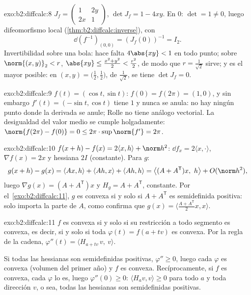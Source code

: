 \begin{solution}{exo:b2:diffcalc:8}
$J_f = \begin{pmatrix} 1 & 2y\\ 2x & 1\end{pmatrix}$, $\det J_f = 1 -
4xy$. En $0$: $\det = 1 \neq 0$, luego difeomorfismo local
(\cref{thm:b2:diffcalc:inverse}), con
\[
\dd(f^{-1})_{(0,0)} = (J_f(0))^{-1} = I_2 .
\]
Invertibilidad sobre una bola: hace falta $4\abs{xy} < 1$ en todo
punto; sobre $\norm{(x,y)}_2 < r$, $\abs{xy} \leq \frac{x^2 +
y^2}{2} < \frac{r^2}{2}$, de modo que $r = \frac{1}{\sqrt2}$ sirve; y
es el mayor posible: en $(x, y) = \bigl(\tfrac12, \tfrac12\bigr)$,
de  $\frac{1}{\sqrt2}$, se tiene $\det J_f = 0$.
\end{solution}

\begin{solution}{exo:b2:diffcalc:9}
$f(t) = (\cos t, \sin t)$: $f(0) = f(2\pi) = (1, 0)$, y sin embargo
$f'(t) = (-\sin t, \cos t)$ tiene  $1$ y nunca se anula: no hay
ningún punto donde la derivada se anule; Rolle no tiene análogo
vectorial. La desigualdad del valor medio se cumple holgadamente:
$\norm{f(2\pi) - f(0)} = 0 \leq 2\pi \cdot \sup\norm{f'} = 2\pi$.
\end{solution}

\begin{solution}{exo:b2:diffcalc:10}
$f(x+h) - f(x) = 2\langle x, h\rangle + \norm h^2$: $\dd f_x =
2\langle x, \cdot\rangle$, $\nabla f(x) = 2x$ y hessiana $2I$
(constante). Para $g$:
\[
g(x + h) - g(x) = \langle Ax, h\rangle + \langle Ah, x\rangle
+ \langle Ah, h\rangle
= \bigl\langle (A + A^{\mathsf T})x,\ h\bigr\rangle +
O(\norm h^2),
\]
luego $\nabla g(x) = (A + A^{\mathsf T})x$ y $H_g = A + A^{\mathsf
T}$, constante. Por el~\cref{exo:b2:diffcalc:11}, $g$ es convexa si y
solo si $A + A^{\mathsf T}$ es semidefinida positiva: solo importa la
parte  de $A$, como confirma que $g(x) = \langle \frac{A +
A^{\mathsf T}}2 x, x\rangle$.
\end{solution}

\begin{solution}{exo:b2:diffcalc:11}
$f$ es convexa si y solo si su restricción a todo segmento es
convexa, es decir, si y solo si toda $\varphi(t) = f(a + tv)$ es
convexa. Por la regla de la cadena, $\varphi''(t) = \langle
H_{a+tv}\,v,\ v\rangle$.

Si todas las hessianas son semidefinidas positivas, $\varphi'' \geq
0$, luego cada $\varphi$ es convexa (volumen del primer año) y $f$ es
convexa. Recíprocamente, si $f$ es convexa, cada $\varphi$ lo es,
luego $\varphi''(0) \geq 0$: $\langle H_a v, v\rangle \geq 0$ para
todo $a$ y toda dirección $v$, o sea, todas las hessianas son
semidefinidas positivas.
\end{solution}

